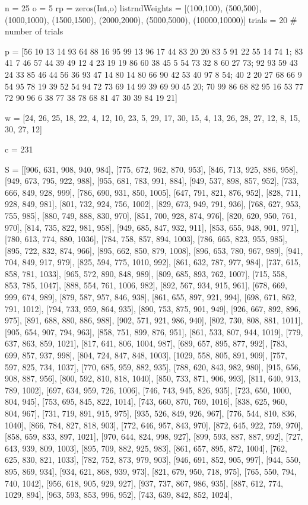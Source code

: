 n = 25
o = 5
rp = zeros(Int,o)
listrndWeights = [(100,100), (500,500), (1000,1000), (1500,1500), (2000,2000), (5000,5000), (10000,10000)]
trials = 20 # number of trials

p = [56 10 13 14 93 64 88 16 95 99 13 96 17 44 83 20 20 83 5 91 22 55 14 74 1; 83 41 7 46 57 44 39 49 12 4 23 19 19 86 60 38 45 5 54 73 32 8 60 27 73; 92 93 59 43 24 33 85 46 44 56 36 93 47 14 80 14 80 66 90 42 53 40 97 8 54; 40 2 20 27 68 66 9 54 95 78 19 39 52 54 94 72 73 69 14 99 39 69 90 45 20; 70 99 86 68 82 95 16 53 77 72 90 96 6 38 77 38 78 68 81 47 30 39 84 19 21]

w = [24, 26, 25, 18, 22, 4, 12, 10, 23, 5, 29, 17, 30, 15, 4, 13, 26, 28, 27, 12, 8, 15, 30, 27, 12]

c = 231


S = [[906, 631, 908, 940, 984], [775, 672, 962, 870, 953], [846, 713, 925, 886, 958], [949, 673, 795, 922, 988], [955, 681, 783, 991, 884], [949, 537, 898, 857, 952], [733, 666, 849, 928, 999], [786, 690, 931, 850, 1005], [647, 791, 821, 876, 952], [828, 711, 928, 849, 981], [801, 732, 924, 756, 1002], [829, 673, 949, 791, 936], [768, 627, 953, 755, 985], [880, 749, 888, 830, 970], [851, 700, 928, 874, 976], [820, 620, 950, 761, 970], [814, 735, 822, 981, 958], [949, 685, 847, 932, 911], [853, 655, 948, 901, 971], [780, 613, 774, 880, 1036], [784, 758, 857, 894, 1003], [786, 665, 823, 955, 985], [895, 722, 832, 874, 966], [895, 662, 850, 879, 1008], [896, 653, 780, 967, 989], [941, 704, 849, 917, 979], [825, 594, 775, 1010, 992], [861, 632, 787, 977, 984], [737, 615, 858, 781, 1033], [965, 572, 890, 848, 989], [809, 685, 893, 762, 1007], [715, 558, 853, 785, 1047], [888, 554, 761, 1006, 982], [892, 567, 934, 915, 961], [678, 669, 999, 674, 989], [879, 587, 957, 846, 938], [861, 655, 897, 921, 994], [698, 671, 862, 791, 1012], [794, 733, 959, 864, 935], [890, 753, 875, 901, 949], [926, 667, 892, 896, 975], [891, 688, 880, 886, 988], [902, 571, 921, 986, 940], [802, 730, 808, 881, 1011], [905, 654, 907, 794, 963], [858, 751, 899, 876, 951], [861, 533, 807, 944, 1019], [779, 637, 863, 859, 1021], [817, 641, 806, 1004, 987], [689, 657, 895, 877, 992], [783, 699, 857, 937, 998], [804, 724, 847, 848, 1003], [1029, 558, 805, 891, 909], [757, 597, 825, 734, 1037], [770, 685, 959, 882, 935], [788, 620, 843, 982, 980], [915, 656, 908, 887, 956], [800, 592, 810, 818, 1040], [850, 733, 871, 906, 993], [811, 640, 913, 789, 1002], [697, 634, 959, 726, 1006], [746, 743, 945, 826, 935], [723, 650, 1000, 804, 945], [753, 695, 845, 822, 1014], [743, 660, 870, 769, 1016], [838, 625, 960, 804, 967], [731, 719, 891, 915, 975], [935, 526, 849, 926, 967], [776, 544, 810, 836, 1040], [866, 784, 827, 818, 903], [772, 646, 957, 843, 970], [872, 645, 922, 759, 970], [858, 659, 833, 897, 1021], [970, 644, 824, 998, 927], [899, 593, 887, 887, 992], [727, 643, 939, 809, 1003], [895, 709, 882, 925, 983], [861, 657, 895, 872, 1004], [762, 625, 830, 821, 1033], [782, 752, 873, 979, 903], [946, 691, 852, 905, 997], [944, 550, 895, 869, 934], [934, 621, 868, 939, 973], [821, 679, 950, 718, 975], [765, 550, 794, 740, 1042], [956, 618, 905, 929, 927], [937, 737, 867, 986, 935], [887, 612, 774, 1029, 894], [963, 593, 853, 996, 952], [743, 639, 842, 852, 1024], 
